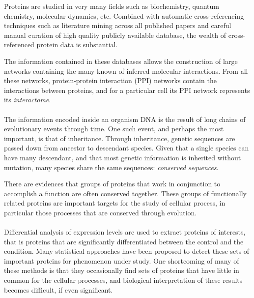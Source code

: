 Proteins are studied in very many fields such as biochemistry, quantum chemistry, molecular dynamics, etc.
Combined with automatic cross-referencing techniques such as literature mining across all published papers and careful manual curation of high quality publicly available database, the wealth of cross-referenced protein data is substantial.

The information contained in these databases allows the construction of large networks containing the many known of inferred molecular interactions.
From all these networks, protein-protein interaction (PPI) networks contain the interactions between proteins, and for a particular cell its PPI network represents its \emph{interactome}.

\paragraph{}

The information encoded inside an organism DNA is the result of long chains of evolutionary events through time.
One such event, and perhaps the most important, is that of inheritance.
Through inheritance, genetic sequences are passed down from ancestor to descendant species.
Given that a single species can have many descendant, and that most genetic information is inherited without mutation, many species share the same sequences: \emph{conserved sequences}.

There are evidences that groups of proteins that work in conjunction to accomplish a function are often conserved together.
These groups of functionally related proteins are important targets for the study of cellular process, in particular those processes that are conserved through evolution.

\paragraph{}

Differential analysis of expression levels are used to extract proteins of interests, that is proteins that are significantly differentiated between the control and the condition.
Many statistical approaches have been proposed to detect these sets of important proteins for phenomenon under study.
One shortcoming of many of these methods is that they occasionally find sets of proteins that have little in common for the cellular processes, and biological interpretation of these results becomes difficult, if even significant.

